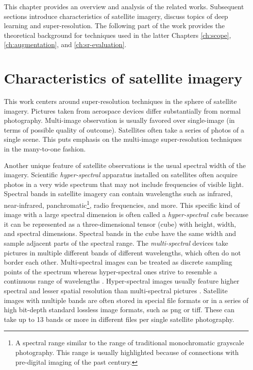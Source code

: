 This chapter provides an overview and analysis of the related works.
Subsequent sections introduce characteristics of satellite imagery, discuss topics of deep learning and super-resolution.
The following part of the work provides the theoretical background for techniques used in the latter Chapters \ref{ch:scope}, \ref{ch:augmentation}, and \ref{ch:sr-evaluation}.

\section{Characteristics of satellite imagery}
This work centers around super-resolution techniques in the sphere of satellite imagery.
Pictures taken from aerospace devices differ substantially from normal photography.
Multi-image observation is usually favored over single-image (in terms of possible quality of outcome).
Satellites often take a series of photos of a single scene.
This puts emphasis on the multi-image super-resolution techniques in the many-to-one fashion.

Another unique feature of satellite observations is the usual spectral width of the imagery.
Scientific \textit{hyper-spectral} apparatus installed on satellites often acquire photos in a very wide spectrum that may not include frequencies of visible light.
Spectral bands in satellite imagery can contain wavelengths such as infrared, near-infrared, panchromatic\footnote{A spectral range similar to the range of traditional monochromatic grayscale photography.
This range is usually highlighted because of connections with pre-digital imaging of the past century.}, radio frequencies, and more.
This specific kind of image with a large spectral dimension is often called a \textit{hyper-spectral cube} because it can be represented as a three-dimensional tensor (cube) with height, width, and spectral dimensions.
Spectral bands in the cube have the same width and sample adjacent parts of the spectral range.
The \textit{multi-spectral} devices take pictures in multiple different bands of different wavelengths, which often do not border each other.
Multi-spectral images can be treated as discrete sampling points of the spectrum whereas hyper-spectral ones strive to resemble a continuous range of wavelengths \cite{osullivan-2011-spectral}. 
Hyper-spectral images usually feature higher spectral and lesser spatial resolution than multi-spectral pictures \cite{feng-2020-spectral}.
Satellite images with multiple bands are often stored in special file formats or in a series of high bit-depth standard lossless image formats, such as \gls{png} or \gls{tiff}.
These can take up to 13 bands or more in different files per single satellite photography.

